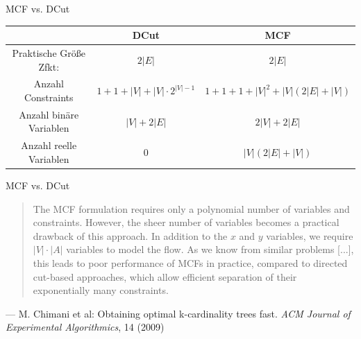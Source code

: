\documentclass[ngerman,aspectratio=169,10pt]{beamer}
\begin{document}
\begin{frame}{MCF vs. DCut}
\begin{tabular}{c|c|c}\hline
   & DCut  & MCF \\\hline
Praktische Größe Zfkt: & $2|E|$ & $2|E|$ \\\hline
Anzahl Constraints & $1+1+|V|+|V|\cdot2^{|V|-1}$ & $1+1+1+|V|^2+|V|(2|E|+|V|)$ \\\hline
Anzahl binäre Variablen & $|V|+2|E|$ & $2|V|+2|E|$ \\\hline
Anzahl reelle Variablen & $0$ & $|V|(2|E|+|V|)$\\\hline
\end{tabular}
\end{frame}

\begin{frame}{MCF vs. DCut}
\begin{quote}
The MCF formulation requires only a polynomial number of variables and constraints. However, the sheer number of variables becomes a practical drawback of this approach. In addition to the $x$ and $y$ variables, we require $|V|\cdot|A|$ variables to model the flow. As we know from similar problems [...], this leads to poor performance of MCFs in practice, compared to directed cut-based approaches, which allow efficient separation of their exponentially many constraints.
\end{quote}
\begin{flushright}
--- M. Chimani et al: Obtaining optimal k-cardinality trees fast. \textit{ACM Journal of Experimental Algorithmics}, 14 (2009)
\end{flushright}
\end{frame}
\end{document}

